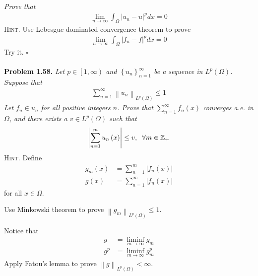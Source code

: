 \documentclass[a4paper]{article}
\numberwithin{equation}{section}
\begin{document}
\textit{Prove that}
\begin{align}
\mathop {\lim }\limits_{n \to \infty } \int_\Omega  {{{\left| {{u_n} - u} \right|}^p}dx}  = 0
\end{align}
\textsc{Hint.} Use Lebesgue dominated convergence theorem to prove 
\begin{align}
\mathop {\lim }\limits_{n \to \infty } \int_\Omega  {{{\left| {{f_n} - f} \right|}^p}dx}  = 0
\end{align}
Try it. \hfill $\square$\\
\\
\textbf{Problem 1.58.} \textit{Let $p \in \left[1,\infty\right)$ and $\left\{ {{u_n}} \right\}_{n = 1}^\infty $ be a sequence in $L^p\left(\Omega\right)$. Suppose that}
\begin{align}
\sum\limits_{n = 1}^\infty  {{{\left\| {{u_n}} \right\|}_{{L^p}\left( \Omega  \right)}}}  \le 1
\end{align}
\textit{Let $f_n\in u_n$ for all positive integers $n$. Prove that $\sum\limits_{n = 1}^\infty  {{f_n}\left( x \right)}$ converges a.e. in $\Omega$, and there exists a $v\in L^p\left(\Omega\right)$ such that}
\begin{align}
\left| {\sum\limits_{n = 1}^m {{u_n}\left( x \right)} } \right| \le v,\hspace{0.2cm}\forall m \in {\mathbb{Z}_ + }
\end{align}
\textsc{Hint.} Define
\begin{align}
{g_m}\left( x \right) &= \sum\limits_{n = 1}^m {\left| {{f_n}\left( x \right)} \right|} \\
g\left( x \right) &= \sum\limits_{n = 1}^\infty  {\left| {{f_n}\left( x \right)} \right|} 
\end{align}
for all $x\in \Omega$.

Use Minkowski theorem to prove ${\left\| {{g_m}} \right\|_{{L^p}\left( \Omega  \right)}} \le 1$.

Notice that 
\begin{align}
g &= \mathop {\lim \inf }\limits_{m \to \infty } {g_m}\\
{g^p} &= \mathop {\lim \inf }\limits_{m \to \infty } g_m^p
\end{align}
Apply Fatou's lemma to prove ${\left\| g \right\|_{{L^p}\left( \Omega  \right)}} < \infty $.
\end{document}
